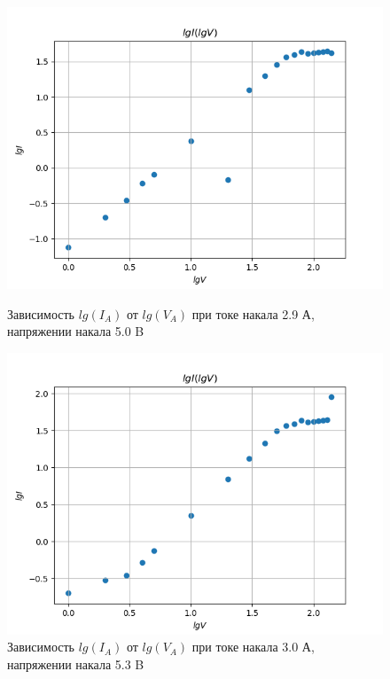 \documentclass[a4paper]{article}
\begin{document}
\begin{figure}[h]
\begin{center}
\begin{minipage}[h]{0.45\linewidth}
\includegraphics[width=1\linewidth]{./Diode/graph_7.png}
\caption{Зависимость $lg(I_A)$ от $lg(V_A)$ при токе накала 2.9 А, напряжении накала 5.0 B }
\label{ris:experimcoded}
\end{minipage}
\hfill 
\begin{minipage}[h]{0.45\linewidth}
\includegraphics[width=1\linewidth]{./Diode/graph_8.png}
\caption{Зависимость $lg(I_A)$ от $lg(V_A)$ при токе накала 3.0 А, напряжении накала 5.3 B }
\label{ris:experimcoded}
\end{minipage}
\end{center}
\end{figure}
\end{document}
